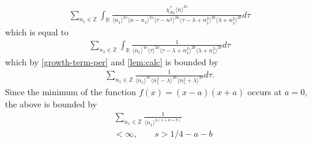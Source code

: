 \documentclass[12pt,reqno]{amsart}
\numberwithin{equation}{section}  %
\numberwithin{figure}{section}
\newcommand{\rr}{\mathbb{R}}
\newcommand{\zz}{\mathbb{Z}}
\theoremstyle{plain}
\theoremstyle{definition}
\theoremstyle{remark}
\begin{document}
\begin{equation*}
\begin{split}
  \sum_{n_{1} \in \zz} \int_{\rr} \frac{\chi^{*}_{B_{3}}
    \langle n \rangle ^{2s}
    }{ \langle n_{1} \rangle^{2s} \langle
    n-n_{1} \rangle ^{2s} \langle \tau - n^{2}    \rangle ^{2a}
    \langle \tau - \lambda + n_{1}^{2} \rangle^{2b}
    \langle  \lambda + n_{1}^{2} \rangle^{2b}  } d \tau  
\end{split}
\end{equation*}
which is equal to
\begin{equation*}
\begin{split}
  \sum_{n_{1} \in \zz} \int_{\rr} \frac{1}
    { \langle n_{1} \rangle^{4s} \langle \tau    \rangle ^{2a}
    \langle \tau - \lambda + n_{1}^{2} \rangle^{2b}
    \langle  \lambda + n_{1}^{2} \rangle^{2b}  } d \tau  
\end{split}
\end{equation*}
which by \eqref{growth-term-per} and \autoref{lem:calc} is bounded by
%
%
\begin{equation*}
\begin{split}
  \sum_{n_{1} \in \zz} \frac{1}
  { \langle n_{1} \rangle^{4s} \langle n_{1}^{2} - \lambda   \rangle ^{2a}
  \langle n_{1}^{2} + \lambda \rangle^{2b}
     } d \tau  .
\end{split}
\end{equation*}
%
%
Since the minimum of the function $f(x) = (x-a)(x+a)$ occurs at $a=0$, the above
is bounded by
\begin{equation*}
\begin{split}
  & \sum_{n_{1} \in \zz} \frac{1}
  { \langle n_{1} \rangle^{4(s+a+b)}} 
  \\
  & < \infty, \qquad s > 1/4 -a -b
\end{split}
\end{equation*}
\end{document}
